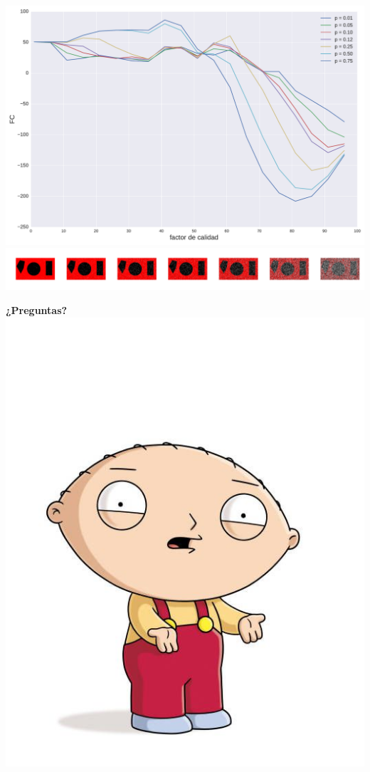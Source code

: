 \documentclass{beamer}
\begin{document}
\begin{frame}
    \begin{center}
        \includegraphics[scale=0.2]{fig/formas_SP_plot.pdf} \\
        \vspace{3mm}
        \includegraphics[scale=0.2]{fig/formas_SP_images.pdf}
    \end{center}
\end{frame}

\begin{frame}
    \begin{center}
        \textbf{¿Preguntas?} \\
        \vspace{3mm}
        \includegraphics[scale=0.2]{fig/preguntas.jpg}
    \end{center}
\end{frame}
\end{document}
